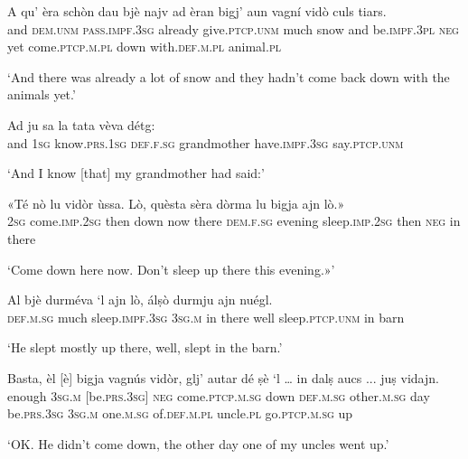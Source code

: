 \begin{linenumbers}
\gll A qu' èra schòn dau bjè najv ad èran bigj’ aun vagní vidò culs tiars.\\  
and \textsc{dem.unm} \textsc{pass.impf.3sg} already give.\textsc{ptcp.unm} much snow and be.\textsc{impf.3pl} \textsc{neg} yet come.\textsc{ptcp.m.pl} down with.\textsc{def.m.pl} animal.\textsc{pl} \\
 \end{linenumbers}
\medskip
\glt `And there was already a lot of snow and they hadn’t come back down with the animals yet.'
\medskip

\begin{linenumbers}
\gll  Ad ju sa la tata vèva détg:   \\
 and \textsc{1sg} know.\textsc{prs.1sg} \textsc{def.f.sg} grandmother have.\textsc{impf.3sg} say.\textsc{ptcp.unm}\\
\end{linenumbers}
\medskip
\glt `And I know [that] my grandmother had said:'
\medskip

\begin{linenumbers}
\gll «Té nò lu vidòr ùssa. Lò, quèsta sèra dòrma lu bigja ajn lò.»\\
 \textsc{2sg} come.\textsc{imp.2sg} then down now there  \textsc{dem.f.sg} evening sleep.\textsc{imp.2sg} then \textsc{neg} in there\\
\end{linenumbers}
\medskip
\glt `Come down here now. Don’t sleep up there this evening.»'
\medskip

\begin{linenumbers}
\gll  Al bjè durméva `l ajn lò, álṣò durmju ajn nuégl.\\
 \textsc{def.m.sg} much sleep.\textsc{impf.3sg} \textsc{3sg.m} in there well sleep.\textsc{ptcp.unm} in barn\\
\end{linenumbers}
\medskip
\glt `He slept mostly up there, well, slept in the barn.'
\medskip

\begin{linenumbers}
\gll  Basta, èl [è] bigja vagnús vidòr, glj’ autar dé ṣè `l … in dalṣ aucs ... juṣ vidajn.  \\
enough \textsc{3sg.m} [be.\textsc{prs.3sg}] \textsc{neg} come.\textsc{ptcp.m.sg} down \textsc{def.m.sg} other.\textsc{m.sg} day be.\textsc{prs.3sg} \textsc{3sg.m} {} one.\textsc{m.sg} of.\textsc{def.m.pl} uncle.\textsc{pl} {} go.\textsc{ptcp.m.sg} up\\
\end{linenumbers}
\medskip
\glt `OK. He didn’t come down, the other day one of my uncles went up.'
\medskip

